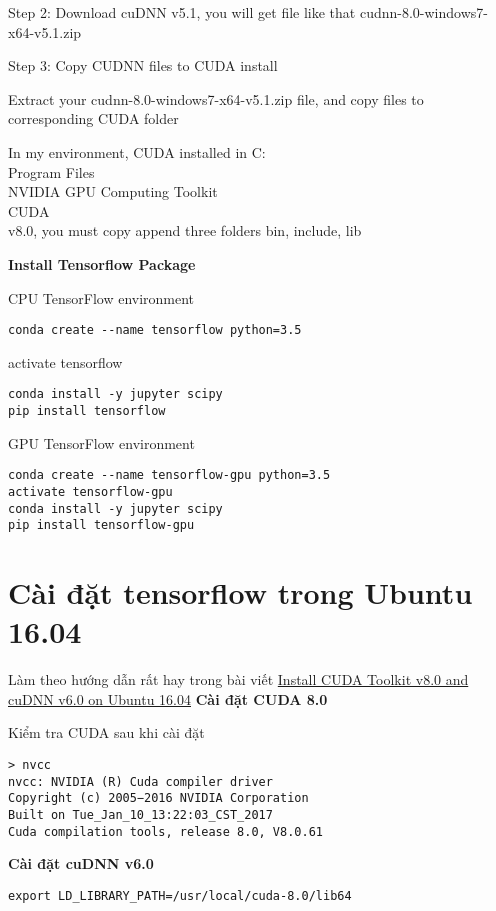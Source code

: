 Step 2: Download cuDNN v5.1, you will get file like that cudnn-8.0-windows7-x64-v5.1.zip


Step 3: Copy CUDNN files to CUDA install

Extract your cudnn-8.0-windows7-x64-v5.1.zip file, and copy files to corresponding CUDA folder

In my environment, CUDA installed in C:\\Program Files\\NVIDIA GPU Computing Toolkit\\CUDA\\v8.0, you must copy append three folders bin, include, lib


\textbf{Install Tensorflow Package}

CPU TensorFlow environment

\begin{lstlisting}
conda create --name tensorflow python=3.5
\end{lstlisting}

activate tensorflow

\begin{lstlisting}
conda install -y jupyter scipy
pip install tensorflow
\end{lstlisting}

GPU TensorFlow environment

\begin{lstlisting}
conda create --name tensorflow-gpu python=3.5
activate tensorflow-gpu
conda install -y jupyter scipy
pip install tensorflow-gpu
\end{lstlisting}

\section{Cài đặt tensorflow trong Ubuntu 16.04}

Làm theo hướng dẫn rất hay trong bài viết \href{https://gist.github.com/mjdietzx/0ff77af5ae60622ce6ed8c4d9b419f45}{Install CUDA Toolkit v8.0 and cuDNN v6.0 on Ubuntu 16.04}
\textbf{Cài đặt CUDA 8.0}

Kiểm tra CUDA sau khi cài đặt

\begin{lstlisting}
> nvcc
nvcc: NVIDIA (R) Cuda compiler driver
Copyright (c) 2005−2016 NVIDIA Corporation
Built on Tue_Jan_10_13:22:03_CST_2017
Cuda compilation tools, release 8.0, V8.0.61
\end{lstlisting}

\textbf{Cài đặt cuDNN v6.0}


\begin{lstlisting}
export LD_LIBRARY_PATH=/usr/local/cuda-8.0/lib64
\end{lstlisting}
